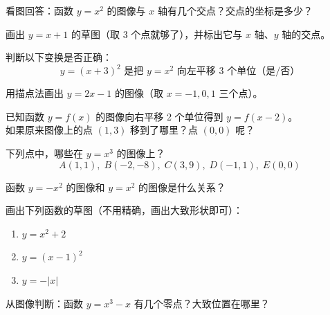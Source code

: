 \begin{exercise}[0]
看图回答：函数 \(y = x^2\) 的图像与 \(x\) 轴有几个交点？交点的坐标是多少？
\end{exercise}

\begin{exercise}[0]
画出 \(y = x + 1\) 的草图（取 3 个点就够了），并标出它与 \(x\) 轴、\(y\) 轴的交点。
\end{exercise}

\begin{exercise}[0]
判断以下变换是否正确：
\[
y = (x + 3)^2 \text{ 是把 } y = x^2 \text{ 向左平移 3 个单位（是/否）}
\]
\end{exercise}


\begin{exercise}[1]
用描点法画出 \(y = 2x - 1\) 的图像（取 \(x = -1, 0, 1\) 三个点）。
\end{exercise}

\begin{exercise}[1]
已知函数 \(y = f(x)\) 的图像向右平移 2 个单位得到 \(y = f(x - 2)\)。\\
如果原来图像上的点 \((1, 3)\) 移到了哪里？点 \((0, 0)\) 呢？
\end{exercise}

\begin{exercise}[1]
下列点中，哪些在 \(y = x^3\) 的图像上？
\[
A(1,1),\; B(-2, -8),\; C(3, 9),\; D(-1, 1),\; E(0,0)
\]
\end{exercise}

\begin{exercise}[1]
函数 \(y = -x^2\) 的图像和 \(y = x^2\) 的图像是什么关系？
\end{exercise}


\begin{exercise}[2]
画出下列函数的草图（不用精确，画出大致形状即可）：
\begin{enumerate}
  \item[(1)] \(y = x^2 + 2\)
  \item[(2)] \(y = (x - 1)^2\)
  \item[(3)] \(y = -|x|\)
\end{enumerate}
\end{exercise}

\begin{exercise}[2]
从图像判断：函数 \(y = x^3 - x\) 有几个零点？大致位置在哪里？
\end{exercise}

